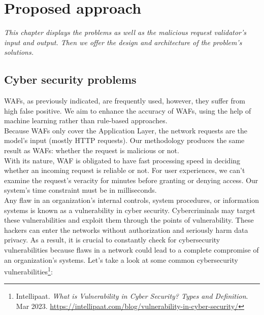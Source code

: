 \chapter{Proposed approach}
\label{chap:proposed_approach}
	\textit{This chapter displays the problems as well as the malicious request validator's input and output. Then we offer the design and architecture of the problem's solutions.}
\minitoc

\section{Cyber security problems}
\label{Cyber problems}
WAFs, as previously indicated, are frequently used, however, they suffer from high false positive. We aim to enhance the accuracy of WAFs, using the help of machine learning rather than rule-based approaches.  \\
Because WAFs only cover the Application Layer, the network requests are the model's input (mostly HTTP requests). Our methodology produces the same result as WAFs: whether the request is malicious or not.\\
With its nature, WAF is obligated to have fast processing speed in deciding whether an incoming request is reliable or not. For user experiences, we can't examine the request's veracity for minutes before granting or denying access. Our system's time constraint must be in milliseconds.\\
Any flaw in an organization's internal controls, system procedures, or information systems is known as a vulnerability in cyber security. Cybercriminals may target these vulnerabilities and exploit them through the points of vulnerability.
These hackers can enter the networks without authorization and seriously harm data privacy. As a result, it is crucial to constantly check for cybersecurity vulnerabilities because flaws in a network could lead to a complete compromise of an organization's systems.
Let's take a look at some common cybersecurity vulnerabilities\footnote{
    Intellipaat. \textit{What is Vulnerability in Cyber Security? Types and Definition}.
    Mar 2023.
    \url{https://intellipaat.com/blog/vulnerability-in-cyber-security/}
}:
